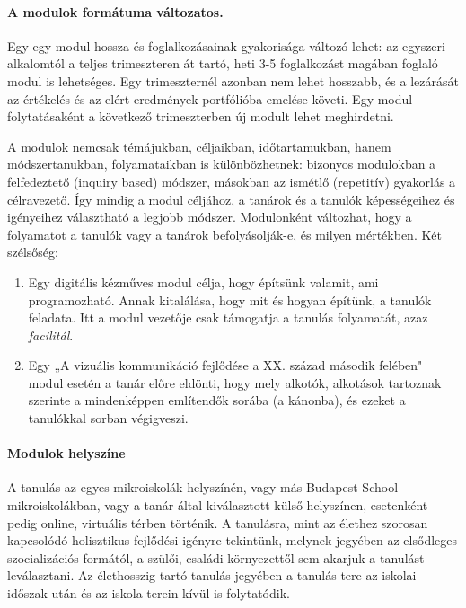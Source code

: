 \paragraph{A modulok formátuma változatos.}
Egy-egy modul hossza és foglalkozásainak gyakorisága változó lehet: az egyszeri
alkalomtól a teljes trimeszteren át tartó, heti 3-5 foglalkozást magában
foglaló modul is lehetséges. Egy trimeszternél azonban nem lehet hosszabb, és a
lezárását az értékelés és az elért eredmények portfólióba emelése követi. Egy
modul folytatásaként a következő trimeszterben új modult lehet meghirdetni.

A modulok nemcsak témájukban, céljaikban, időtartamukban, hanem
módszertanukban, folyamataikban is különbözhetnek: bizonyos modulokban a
felfedeztető (inquiry based) módszer, másokban az ismétlő (repetitív) gyakorlás
a célravezető. Így mindig a modul céljához, a tanárok és a tanulók
képességeihez és igényeihez választható a legjobb módszer. Modulonként
változhat, hogy a folyamatot a tanulók vagy a tanárok befolyásolják-e, és
milyen mértékben. Két szélsőség:
\begin{enumerate}
  \item Egy digitális kézműves modul célja, hogy építsünk valamit, ami
        programozható. Annak kitalálása, hogy mit és hogyan építünk, a tanulók
        feladata. Itt a modul vezetője csak támogatja a tanulás folyamatát, azaz
        \emph{facilitál}.

  \item Egy „A vizuális kommunikáció fejlődése a XX. század második felében"
        modul esetén a tanár előre eldönti, hogy mely alkotók, alkotások tartoznak
        szerinte a mindenképpen említendők sorába (a kánonba), és ezeket a tanulókkal
        sorban végigveszi.
\end{enumerate}

\paragraph {Modulok helyszíne}

A tanulás az egyes mikroiskolák helyszínén, vagy más Budapest School
mikroiskolákban, vagy a tanár által kiválasztott külső helyszínen, esetenként
pedig online, virtuális térben történik. A tanulásra, mint az élethez szorosan
kapcsolódó holisztikus fejlődési igényre tekintünk, melynek jegyében az
elsődleges szocializációs formától, a szülői, családi környezettől sem akarjuk
a tanulást leválasztani. Az élethosszig tartó tanulás jegyében a tanulás tere
az iskolai időszak után és az iskola terein kívül is folytatódik.

